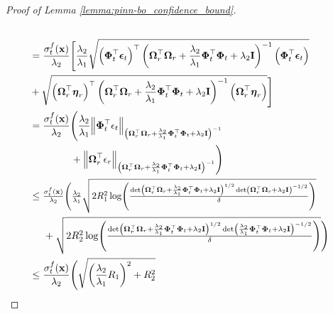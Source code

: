 \begin{proof}[Proof of Lemma \ref{lemma:pinn-bo_confidence_bound}]
\begin{align*}
                \\ 
                & = \frac{\sigma_t^f(\mathbf{x})}{\lambda_2}\Bigg[ \frac{\lambda_2}{\lambda_1}\sqrt{\left(\boldsymbol{\Phi}_t^\top \boldsymbol{\epsilon}_t \right)^\top\left(\boldsymbol{\Omega}_r^\top \boldsymbol{\Omega}_r + \frac{\lambda_2}{\lambda_1}\boldsymbol{\Phi}_t^\top\boldsymbol{\Phi}_t + \lambda_2\mathbf{I}\right)^{-1} 
                 \left(\boldsymbol{\Phi}_t^\top \boldsymbol{\epsilon}_t\right)} \notag \\
                 &+ \sqrt{\left(\boldsymbol{\Omega}_r^\top \boldsymbol{\eta}_r \right)^\top\left(\boldsymbol{\Omega}_r^\top \boldsymbol{\Omega}_r + \frac{\lambda_2}{\lambda_1}\boldsymbol{\Phi}_t^\top\boldsymbol{\Phi}_t + \lambda_2\mathbf{I}\right)^{-1} 
                 \left(\boldsymbol{\Omega}_r^\top \boldsymbol{\eta}_r\right)} \Bigg] 
                 \\
                 &= \frac{\sigma_t^f(\mathbf{x})}{\lambda_2} \Bigg(\frac{\lambda_2}{\lambda_1} \norm{\boldsymbol{\Phi}_t^\top\epsilon_t}_{\left(\boldsymbol{\Omega}_r^\top \boldsymbol{\Omega}_r + \frac{\lambda_2}{\lambda_1}\boldsymbol{\Phi}_t^\top\boldsymbol{\Phi}_t + \lambda_2\mathbf{I} \right)^{-1}} \notag 
                 \\ & \;\;\;\;\;\;\;\;\;\;\;\;\;\;\; +\norm{\boldsymbol{\Omega}_r^\top\epsilon_r}_{\left(\boldsymbol{\Omega}_r^\top \boldsymbol{\Omega}_r + \frac{\lambda_2}{\lambda_1}\boldsymbol{\Phi}_t^\top\boldsymbol{\Phi}_t + \lambda_2\mathbf{I} \right)^{-1}} \Bigg) 
                 \\
                 & \le \resizebox{0.8\textwidth}{!}{$\frac{\sigma_t^f(\mathbf{x})}{\lambda_2}  \Bigg(\frac{\lambda_2} {\lambda_1} \sqrt{2R_1^2 \log(\frac{\det(\boldsymbol{\Omega}_r^\top \boldsymbol{\Omega}_r + \frac{\lambda_2}{\lambda_1}\boldsymbol{\Phi}_t^\top\boldsymbol{\Phi}_t + \lambda_2\mathbf{I})^{1/2}\det(\boldsymbol{\Omega}_r^\top \boldsymbol{\Omega}_r + \lambda_2\mathbf{I})^{-1/2}}{\delta})} $}  
                 \\
                 & \;\;\;\;\; + \resizebox{0.8\textwidth}{!}{$\sqrt{2R_2^2 \log(\frac{\det(\boldsymbol{\Omega}_r^\top \boldsymbol{\Omega}_r + \frac{\lambda_2}{\lambda_1}\boldsymbol{\Phi}_t^\top\boldsymbol{\Phi}_t + \lambda_2\mathbf{I})^{1/2}\det(\frac{\lambda_2}{\lambda_1}\boldsymbol{\Phi}_t^\top\boldsymbol{\Phi}_t + \lambda_2\mathbf{I})^{-1/2}}{\delta})} \Bigg) $}
                 \\
                 & \le \frac{\sigma_t^f(\mathbf{x})}{\lambda_2} \Bigg(\sqrt{\left(\frac{\lambda_2}{\lambda_1}R_1\right)^2 + R_2^2} \notag \\

\end{align*}
\end{proof}
